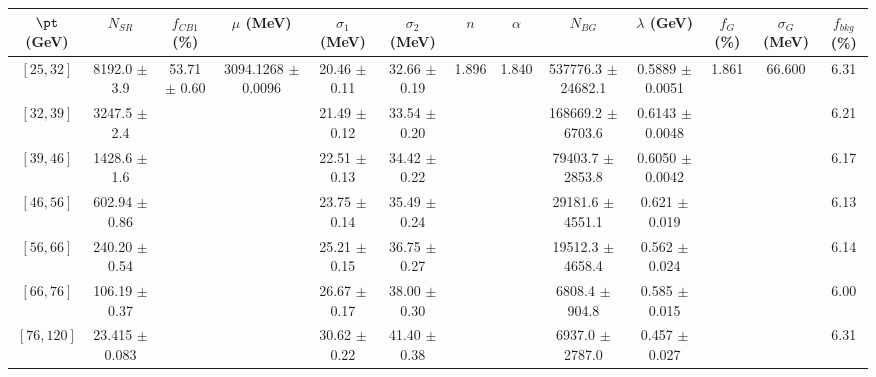 \begin{tabular}{c||c|c|c|c|c|c|c|c|c|c|c||c}
$\pt$ (GeV) & $N_{SR}$ & $f_{CB1}$ (\%) & $\mu$ (MeV) & $\sigma_1$ (MeV) & $\sigma_2$ (MeV) & $n$ & $\alpha$ & $N_{BG}$ & $\lambda$ (GeV) & $f_G$ (\%) & $\sigma_G$ (MeV) & $f_{bkg}$ (\%) \\
\hline
$[25, 32]$ & 8192.0 $\pm$ 3.9 & \multirow{7}{*}{53.71 $\pm$ 0.60} & \multirow{7}{*}{3094.1268 $\pm$ 0.0096} & 20.46 $\pm$ 0.11 & 32.66 $\pm$ 0.19 & \multirow{7}{*}{1.896} & \multirow{7}{*}{1.840} & 537776.3 $\pm$ 24682.1 & 0.5889 $\pm$ 0.0051 & \multirow{7}{*}{1.861} & \multirow{7}{*}{66.600} & 6.31\\
$[32, 39]$ & 3247.5 $\pm$ 2.4 &  &  & 21.49 $\pm$ 0.12 & 33.54 $\pm$ 0.20 &  &  & 168669.2 $\pm$ 6703.6 & 0.6143 $\pm$ 0.0048 &  &  & 6.21\\
$[39, 46]$ & 1428.6 $\pm$ 1.6 &  &  & 22.51 $\pm$ 0.13 & 34.42 $\pm$ 0.22 &  &  & 79403.7 $\pm$ 2853.8 & 0.6050 $\pm$ 0.0042 &  &  & 6.17\\
$[46, 56]$ & 602.94 $\pm$ 0.86 &  &  & 23.75 $\pm$ 0.14 & 35.49 $\pm$ 0.24 &  &  & 29181.6 $\pm$ 4551.1 & 0.621 $\pm$ 0.019 &  &  & 6.13\\
$[56, 66]$ & 240.20 $\pm$ 0.54 &  &  & 25.21 $\pm$ 0.15 & 36.75 $\pm$ 0.27 &  &  & 19512.3 $\pm$ 4658.4 & 0.562 $\pm$ 0.024 &  &  & 6.14\\
$[66, 76]$ & 106.19 $\pm$ 0.37 &  &  & 26.67 $\pm$ 0.17 & 38.00 $\pm$ 0.30 &  &  & 6808.4 $\pm$ 904.8 & 0.585 $\pm$ 0.015 &  &  & 6.00\\
$[76, 120]$ & 23.415 $\pm$ 0.083 &  &  & 30.62 $\pm$ 0.22 & 41.40 $\pm$ 0.38 &  &  & 6937.0 $\pm$ 2787.0 & 0.457 $\pm$ 0.027 &  &  & 6.31\\
\end{tabular}
